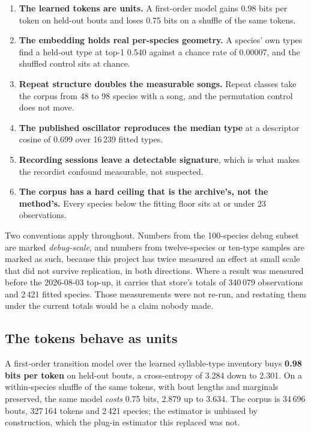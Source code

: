 \documentclass[10pt,twocolumn,a4paper]{article}
\begin{document}
\begin{enumerate}
\item \textbf{The learned tokens are units.} A first-order model gains 0.98 bits per token on
held-out bouts and loses 0.75 bits on a shuffle of the same tokens.
\item \textbf{The embedding holds real per-species geometry.} A species' own types find a
held-out type at top-1 0.540 against a chance rate of 0.00007, and the shuffled control sits
at chance.
\item \textbf{Repeat structure doubles the measurable songs.} Repeat classes take the corpus
from 48 to 98 species with a song, and the permutation control does not move.
\item \textbf{The published oscillator reproduces the median type} at a descriptor cosine of
0.699 over 16\,239 fitted types.
\item \textbf{Recording sessions leave a detectable signature}, which is what makes the
recordist confound measurable, not suspected.
\item \textbf{The corpus has a hard ceiling that is the archive's, not the method's.} Every
species below the fitting floor sits at or under 23 observations.
\end{enumerate}

Two conventions apply throughout. Numbers from the 100-species debug subset are marked
\emph{debug-scale}, and numbers from twelve-species or ten-type samples are marked as such,
because this project has twice measured an effect at small scale that did not survive
replication, in both directions. Where a result was measured before the 2026-08-03 top-up, it
carries that store's totals of 340\,079 observations and 2\,421 fitted species. Those
measurements were not re-run, and restating them under the current totals would be a claim
nobody made.

\subsection{The tokens behave as units}

A first-order transition model over the learned syllable-type inventory buys \textbf{0.98
bits per token} on held-out bouts, a cross-entropy of 3.284 down to 2.301. On a
within-species shuffle of the same tokens, with bout lengths and marginals preserved, the
same model \emph{costs} 0.75 bits, 2.879 up to 3.634. The corpus is 34\,696 bouts, 327\,164
tokens and 2\,421 species; the estimator is unbiased by construction, which the plug-in
estimator this replaced was not.
\end{document}
